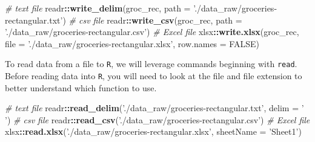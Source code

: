 \documentclass[
]{article}
\newenvironment{Shaded}{\begin{snugshade}}{\end{snugshade}}
\newcommand{\CommentTok}[1]{\textcolor[rgb]{0.56,0.35,0.01}{\textit{#1}}}
\newcommand{\DataTypeTok}[1]{\textcolor[rgb]{0.13,0.29,0.53}{#1}}
\newcommand{\KeywordTok}[1]{\textcolor[rgb]{0.13,0.29,0.53}{\textbf{#1}}}
\newcommand{\NormalTok}[1]{#1}
\newcommand{\OperatorTok}[1]{\textcolor[rgb]{0.81,0.36,0.00}{\textbf{#1}}}
\newcommand{\OtherTok}[1]{\textcolor[rgb]{0.56,0.35,0.01}{#1}}
\newcommand{\StringTok}[1]{\textcolor[rgb]{0.31,0.60,0.02}{#1}}
\begin{document}
\begin{Shaded}
\begin{Highlighting}[]
\CommentTok{# text file}
\NormalTok{readr}\OperatorTok{::}\KeywordTok{write_delim}\NormalTok{(groc_rec, }\DataTypeTok{path =} \StringTok{'./data_raw/groceries-rectangular.txt'}\NormalTok{)}
\CommentTok{# csv file}
\NormalTok{readr}\OperatorTok{::}\KeywordTok{write_csv}\NormalTok{(groc_rec, }\DataTypeTok{path =} \StringTok{'./data_raw/groceries-rectangular.csv'}\NormalTok{)}
\CommentTok{# Excel file}
\NormalTok{xlsx}\OperatorTok{::}\KeywordTok{write.xlsx}\NormalTok{(groc_rec, }\DataTypeTok{file =} \StringTok{'./data_raw/groceries-rectangular.xlsx'}\NormalTok{, }\DataTypeTok{row.names =} \OtherTok{FALSE}\NormalTok{)}
\end{Highlighting}
\end{Shaded}

To read data from a file to \texttt{R}, we will leverage commands beginning with \texttt{read}. Before reading data into \texttt{R}, you will need to look at the file and file extension to better understand which function to use.

\begin{Shaded}
\begin{Highlighting}[]
\CommentTok{# text file}
\NormalTok{readr}\OperatorTok{::}\KeywordTok{read_delim}\NormalTok{(}\StringTok{'./data_raw/groceries-rectangular.txt'}\NormalTok{, }\DataTypeTok{delim =} \StringTok{' '}\NormalTok{)}
\CommentTok{# csv file}
\NormalTok{readr}\OperatorTok{::}\KeywordTok{read_csv}\NormalTok{(}\StringTok{'./data_raw/groceries-rectangular.csv'}\NormalTok{)}
\CommentTok{# Excel file}
\NormalTok{xlsx}\OperatorTok{::}\KeywordTok{read.xlsx}\NormalTok{(}\StringTok{'./data_raw/groceries-rectangular.xlsx'}\NormalTok{, }\DataTypeTok{sheetName =} \StringTok{'Sheet1'}\NormalTok{)}
\end{Highlighting}
\end{Shaded}
\end{document}
